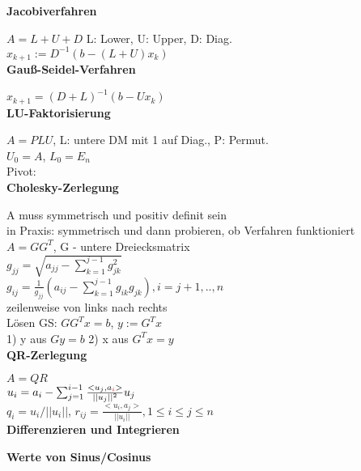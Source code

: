 \documentclass[10pt,twocolumn,a4paper]{article}
\begin{document}
\begin{flushleft}
\textbf{Jacobiverfahren}

$A = L + U + D$ L: Lower, U: Upper, D: Diag.\\
$x_{k+1} := D^{-1}(b-(L+U)x_k)$\\

\textbf{Gauß-Seidel-Verfahren}

$x_{k+1} = (D+L)^{-1} (b-Ux_k)$\\

\textbf{LU-Faktorisierung}

$A = PLU$, L: untere DM mit 1 auf Diag., P: Permut.\\
$U_0 = A$, $L_0 = E_n$\\
Pivot: \\

\textbf{Cholesky-Zerlegung}

A muss symmetrisch und positiv definit sein\\
in Praxis: symmetrisch und dann probieren, ob Verfahren funktioniert\\
$A = GG^T$, G - untere Dreiecksmatrix\\
$g_{jj} = \sqrt{a_{jj} - \sum_{k=1}^{j-1} g_{jk}^2}$\\
$g_{ij} = \frac{1}{g_{jj}} (a_{ij} - \sum_{k=1}^{j-1} g_{ik}g_{jk}), i=j+1,..,n$\\
zeilenweise von links nach rechts\\
Lösen GS: $GG^Tx=b$, $y:=G^Tx$\\
1) y aus $Gy=b$ 2) x aus $G^Tx=y$\\

\textbf{QR-Zerlegung}

$A = QR$\\
$u_i = a_i - \sum_{j=1}^{i-1} \frac{<u_j, a_{\textcolor{red}{i}}>}{||u_j||^2}u_j$\\
$q_i = u_i / ||u_i||$, $r_{ij} = \frac{<u_i, a_j>}{||u_i||}, 1 \leq i \leq j \leq n$\\




\textbf{Differenzieren und Integrieren}

\textbf{Werte von Sinus/Cosinus}




\end{flushleft}
\end{document}
